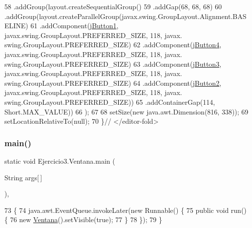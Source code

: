 \begin{DoxyCode}
58             .addGroup(layout.createSequentialGroup()
59                 .addGap(68, 68, 68)
60                 .addGroup(layout.createParallelGroup(javax.swing.GroupLayout.Alignment.BASELINE)
61                     .addComponent(\mbox{\hyperlink{class_ejercicio3_1_1_ventana_a78dd8dc5e6b6a1d1558465cafa164556}{jButton1}}, javax.swing.GroupLayout.PREFERRED\_SIZE, 118, javax.
      swing.GroupLayout.PREFERRED\_SIZE)
62                     .addComponent(\mbox{\hyperlink{class_ejercicio3_1_1_ventana_aa96e8c70f82bc835f2218641fd1b0649}{jButton4}}, javax.swing.GroupLayout.PREFERRED\_SIZE, 118, javax.
      swing.GroupLayout.PREFERRED\_SIZE)
63                     .addComponent(\mbox{\hyperlink{class_ejercicio3_1_1_ventana_ac44e593863c65fac1c8ce056ce552be6}{jButton3}}, javax.swing.GroupLayout.PREFERRED\_SIZE, 118, javax.
      swing.GroupLayout.PREFERRED\_SIZE)
64                     .addComponent(\mbox{\hyperlink{class_ejercicio3_1_1_ventana_a79e68bd221077efe89ad7a79052bc1a7}{jButton2}}, javax.swing.GroupLayout.PREFERRED\_SIZE, 118, javax.
      swing.GroupLayout.PREFERRED\_SIZE))
65                 .addContainerGap(114, Short.MAX\_VALUE))
66         );
67  
68         setSize(\textcolor{keyword}{new} java.awt.Dimension(816, 338));
69         setLocationRelativeTo(null);
70     \}\textcolor{comment}{// </editor-fold>}
\end{DoxyCode}
\mbox{\label{class_ejercicio3_1_1_ventana_acd36ab24992fabfa4014d39b46411c2b}} 
\subsubsection{\texorpdfstring{main()}{main()}}
{\footnotesize\ttfamily static void Ejercicio3.\+Ventana.\+main (\begin{DoxyParamCaption}\item[{String}]{args\mbox{[}$\,$\mbox{]} }\end{DoxyParamCaption})\hspace{0.3cm}{\ttfamily [inline]}, {\ttfamily [static]}}


\begin{DoxyCode}
73     \{
74         java.awt.EventQueue.invokeLater(\textcolor{keyword}{new} Runnable() \{
75             \textcolor{keyword}{public} \textcolor{keywordtype}{void} run() \{
76                 \textcolor{keyword}{new} \mbox{\hyperlink{class_ejercicio3_1_1_ventana_a58b0e4567e87b274acb3c7561643d17e}{Ventana}}().setVisible(\textcolor{keyword}{true});
77             \}
78         \});
79     \}
\end{DoxyCode}


